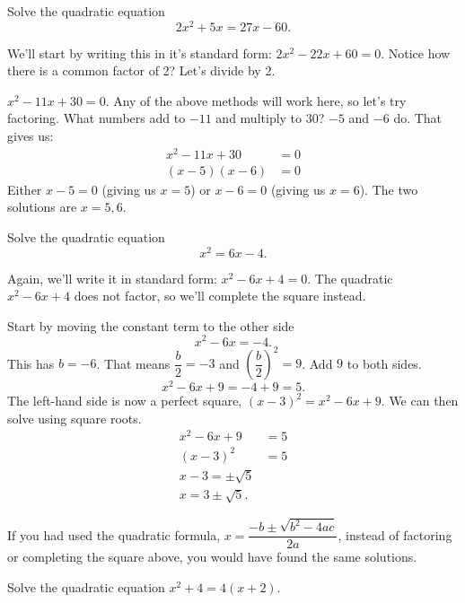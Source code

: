 \documentclass{ximera}
\begin{document}
\begin{example}
	Solve the quadratic equation
	\[ 2x^2 +5x = 27 x - 60. \]
	\begin{explanation}
		We'll start by writing this in it's standard form: $2x^2 - 22x + 60 = 0$.  Notice how there is a common factor of 2? Let's divide by 2.
		
		$x^2 - 11x + 30 = 0$.  Any of the above methods will work here, so let's try factoring.  What numbers add to $-11$ and multiply to $30$?
		$-5$ and $-6$ do. That gives us:
		\begin{align*}
			x^2 - 11x + 30 &= 0\\
			(x-5)(x-6) &= 0
		\end{align*}
		Either $x-5 = 0$ (giving us $x=5$) or $x-6 = 0$ (giving us $x=6$).  The two solutions are $x = 5, 6$.
	\end{explanation}
\end{example}	

\begin{example}
	Solve the quadratic equation
	\[  x^2 = 6x -4.\]
	\begin{explanation}
		Again, we'll write it in standard form: $x^2 - 6x + 4 = 0$.  The quadratic $x^2 -6x+4$ does not factor, so we'll complete the square instead.
		
		Start by moving the constant term to the other side
		\[ x^2 - 6x = -4. \]
		This has $b = -6$.  That means $\displaystyle \dfrac{b}{2} = -3$ and $\displaystyle \left( \dfrac{b}{2}\right)^2 = 9$.  Add $9$ to both sides.
		\[ x^2 - 6x + 9 = -4 + 9 = 5. \]
		The left-hand side is now a perfect square, $\left(x-3\right)^2 = x^2 - 6x + 9$.  We can then solve using square roots.
		\begin{align*}
			x^2 - 6x + 9 &=  5\\
			\left( x-3 \right)^2 &= 5\\
			x-3 = \pm \sqrt{5} \\
			x = 3 \pm \sqrt{5}.
		\end{align*}
	\end{explanation}
\end{example}
If you had used the quadratic formula, $\displaystyle x = \dfrac{-b \pm \sqrt{b^2-4ac}}{2a}$, instead of factoring or completing the square above, you would have found the same solutions.

\begin{problem}
	Solve the quadratic equation $\displaystyle x^2 + 4 = 4\left(x+2\right)$.
	\begin{multipleChoice}
  \end{multipleChoice}
\end{problem}
\end{document}
